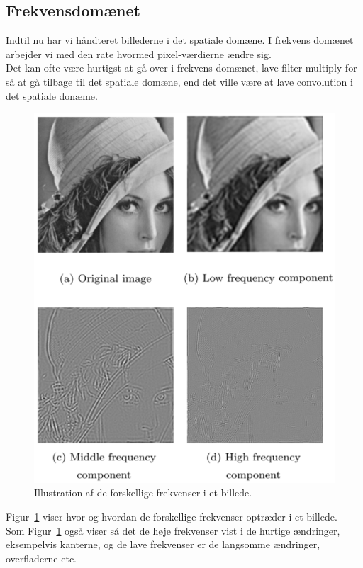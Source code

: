 \subsection{Frekvensdomænet}
Indtil nu har vi håndteret billederne i det spatiale domæne. I frekvens domænet arbejder vi med den rate hvormed pixel-værdierne ændre sig.\\

Det kan ofte være hurtigst at gå over i frekvens domænet, lave filter multiply for så at gå tilbage til det spatiale domæne, end det ville være at lave convolution i det spatiale donæme. 

\begin{figure}[H]
	\centering
	\includegraphics[width=0.7\linewidth]{figs/spm05/frequencies}
	\caption{Illustration af de forskellige frekvenser i et billede.}
	\label{fig:frequencies}
\end{figure}

Figur~\ref{fig:frequencies} viser hvor og hvordan de forskellige frekvenser optræder i et billede.\\

Som Figur~\ref{fig:frequencies} også viser så det de høje frekvenser vist i de hurtige ændringer, eksempelvis kanterne, og de lave frekvenser er de langsomme ændringer, overfladerne etc.